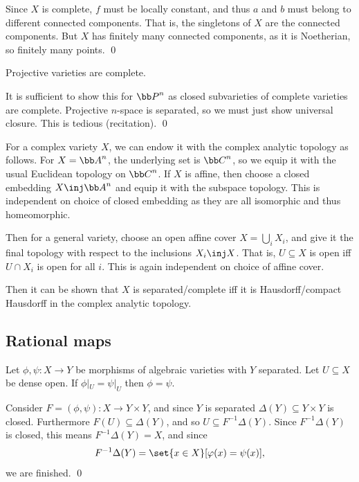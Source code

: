     Since $X$ is complete, $f$ must be locally constant, and thus $a$ and $b$ must belong to different connected components.
    That is, the singletons of $X$ are the connected components.
    But $X$ has finitely many connected components, as it is Noetherian, so finitely many points.
    \qed

\eproof

\bthrm

    Projective varieties are complete.

\ethrm

\bproof

    It is sufficient to show this for $\bP^n$ as closed subvarieties of complete varieties are complete.
    Projective $n$-space is separated, so we must just show universal closure.
    This is tedious (recitation).
    \qed

\eproof

\bnote

    For a complex variety $X$, we can endow it with the {\emphcolor complex analytic topology} as follows.
    For $X=\bA^n$, the underlying set is $\bC^n$, so we equip it with the usual Euclidean topology on $\bC^n$.
    If $X$ is affine, then choose a closed embedding $X\inj\bA^n$ and equip it with the subspace topology.
    This is independent on choice of closed embedding as they are all isomorphic and thus homeomorphic.

    Then for a general variety, choose an open affine cover $X=\bigcup_iX_i$, and give it the final topology with
    respect to the inclusions $X_i\inj X$.
    That is, $U\subseteq X$ is open iff $U\cap X_i$ is open for all $i$.
    This is again independent on choice of affine cover.

    Then it can be shown that $X$ is separated/complete iff it is Hausdorff/compact Hausdorff in the complex analytic
    topology.

\enote

\subsection{Rational maps}

\blemm

    Let $\phi,\psi\colon X\to Y$ be morphisms of algebraic varieties with $Y$ separated.
    Let $U\subseteq X$ be dense open.
    If $\phi|_U=\psi|_U$ then $\phi=\psi$.

\elemm

\bproof

    Consider $F=(\phi,\psi)\colon X\to Y\times Y$, and since $Y$ is separated $\Delta(Y)\subseteq Y\times Y$ is closed.
    Furthermore $F(U)\subseteq\Delta(Y)$, and so $U\subseteq F^{-1}\Delta(Y)$.
    Since $F^{-1}\Delta(Y)$ is closed, this means $F^{-1}\Delta(Y)=X$, and since
    $$ F^{-1}\Delta(Y) = \set{x\in X}[\phi(x)=\psi(x)] , $$
    we are finished.
    \qed

